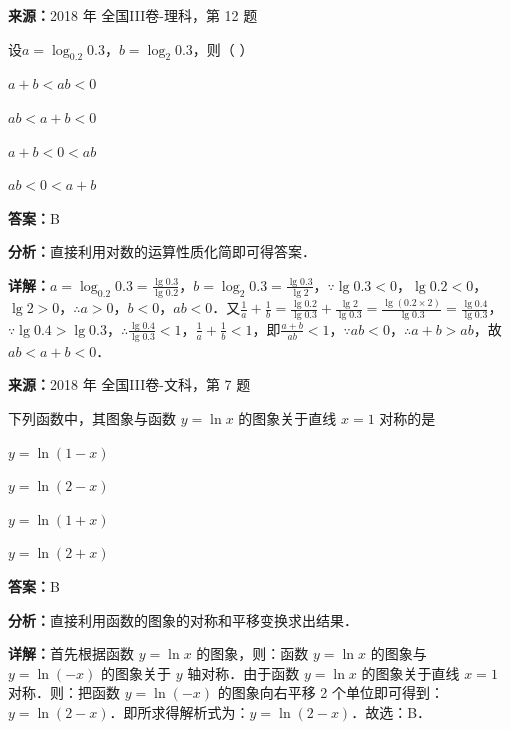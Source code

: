 \begin{question}[points=5]
\textbf{来源：}2018 年 全国III卷-理科，第 12 题\par
设$a=\log_{0.2}0.3$，$b=\log_2 0.3$，则（ ）
\begin{choices}
  \item $a+b<ab<0$
  \item $ab<a+b<0$
  \item $a+b<0<ab$
  \item $ab<0<a+b$
\end{choices}
\begin{solution}
\textbf{答案：}B

\textbf{分析：}直接利用对数的运算性质化简即可得答案．

\textbf{详解：}$a=\log_{0.2}0.3=\frac{\lg0.3}{\lg0.2}$，$b=\log_2 0.3=\frac{\lg0.3}{\lg2}$，$\because \lg0.3<0$，$\lg0.2<0$，$\lg2>0$，$\therefore a>0$，$b<0$，$ab<0$．又$\frac{1}{a}+\frac{1}{b}=\frac{\lg0.2}{\lg0.3}+\frac{\lg2}{\lg0.3}=\frac{\lg(0.2\times2)}{\lg0.3}=\frac{\lg0.4}{\lg0.3}$，$\because \lg0.4>\lg0.3$，$\therefore \frac{\lg0.4}{\lg0.3}<1$，$\frac{1}{a}+\frac{1}{b}<1$，即$\frac{a+b}{ab}<1$，$\because ab<0$，$\therefore a+b>ab$，故$ab<a+b<0$．
\end{solution}
\end{question}

\begin{question}[points=5]
\textbf{来源：}2018 年 全国III卷-文科，第 7 题\par
下列函数中，其图象与函数 $y=\ln x$ 的图象关于直线 $x=1$ 对称的是
\begin{choices}
  \item $y=\ln(1-x)$
  \item $y=\ln(2-x)$
  \item $y=\ln(1+x)$
  \item $y=\ln(2+x)$
\end{choices}
\begin{solution}
\textbf{答案：}B

\textbf{分析：}直接利用函数的图象的对称和平移变换求出结果．

\textbf{详解：}首先根据函数 $y=\ln x$ 的图象，则：函数 $y=\ln x$ 的图象与 $y=\ln(-x)$ 的图象关于 $y$ 轴对称．由于函数 $y=\ln x$ 的图象关于直线 $x=1$ 对称．则：把函数 $y=\ln(-x)$ 的图象向右平移 2 个单位即可得到：$y=\ln(2-x)$．即所求得解析式为：$y=\ln(2-x)$．故选：B．
\end{solution}
\end{question}

